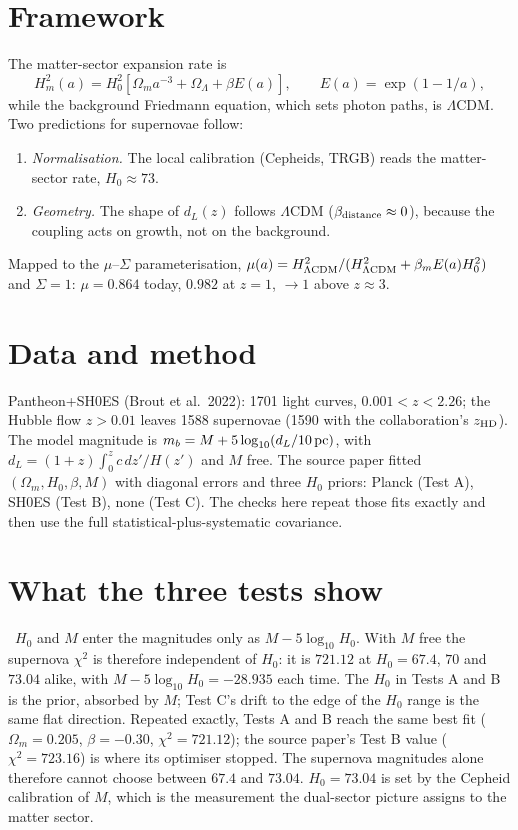 \section{Framework}
The matter-sector expansion rate is
\begin{equation}
H_m^2(a)=H_0^2\left[\Omega_ma^{-3}+\Omega_\Lambda+\beta E(a)\right],\qquad E(a)=\exp(1-1/a),
\end{equation}
while the background Friedmann equation, which sets photon paths, is $\Lambda$CDM. Two predictions for supernovae follow:
\begin{enumerate}
\item \emph{Normalisation.} The local calibration (Cepheids, TRGB) reads the matter-sector rate, $H_0\approx73$.
\item \emph{Geometry.} The shape of $d_L(z)$ follows $\Lambda$CDM ($\beta_{\rm distance}\approx0$), because the coupling acts on growth, not on the background.
\end{enumerate}
Mapped to the $\mu$--$\Sigma$ parameterisation, $\mu(a)=H^2_{\Lambda\rm CDM}/(H^2_{\Lambda\rm CDM}+\beta_mE(a)H_0^2)$ and $\Sigma=1$: $\mu=0.864$ today, $0.982$ at $z=1$,
$\to1$ above $z\approx3$.

\section{Data and method}
Pantheon+SH0ES (Brout et al.\ 2022): 1701 light curves, $0.001<z<2.26$; the Hubble flow $z>0.01$ leaves 1588 supernovae (1590 with the collaboration's
$z_{\rm HD}$). The model magnitude is $m_b=M+5\log_{10}(d_L/10\,{\rm pc})$, with $d_L=(1+z)\int_0^z c\,dz'/H(z')$ and $M$ free. The source paper fitted
$(\Omega_m,H_0,\beta,M)$ with diagonal errors and three $H_0$ priors: Planck (Test A), SH0ES (Test B), none (Test C). The checks here repeat those fits exactly
and then use the full statistical-plus-systematic covariance.

\section{What the three tests show}\label{sec:dsv_tests}
\calc\ $H_0$ and $M$ enter the magnitudes only as $M-5\log_{10}H_0$. With $M$ free the supernova $\chi^2$ is therefore independent of $H_0$: it is $721.12$ at
$H_0=67.4$, $70$ and $73.04$ alike, with $M-5\log_{10}H_0=-28.935$ each time. The $H_0$ in Tests A and B is the prior, absorbed by $M$; Test C's drift to the edge
of the $H_0$ range is the same flat direction. Repeated exactly, Tests A and B reach the same best fit ($\Omega_m=0.205$, $\beta=-0.30$, $\chi^2=721.12$); the source
paper's Test B value ($\chi^2=723.16$) is where its optimiser stopped. The supernova magnitudes alone therefore cannot choose between $67.4$ and $73.04$.
$H_0=73.04$ is set by the Cepheid calibration of $M$, which is the measurement the dual-sector picture assigns to the matter sector.

